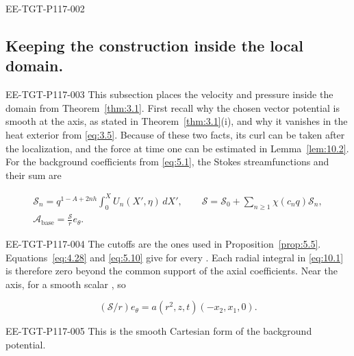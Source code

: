 \begin{EESegment}{EE-TGT-P117-002}
\subsection{Keeping the construction inside the local domain.}\label{sec:10.1}
\end{EESegment}
\begin{EESegment}{EE-TGT-P117-003}
This subsection places the velocity and pressure inside the domain from
Theorem~\ref{thm:3.1}. First recall why the chosen vector potential
 is smooth at the axis, as stated in
Theorem~\ref{thm:3.1}\textup{(i)}, and why it vanishes in the heat exterior from
\eqref{eq:3.5}. Because of these two facts, its curl can be taken after the localization, and the
force at time one can be estimated in Lemma~\ref{lem:10.2}. For the background coefficients
 from \eqref{eq:5.1}, the Stokes streamfunctions and their sum are
\end{EESegment}
\begin{equation}
\begin{gathered}
\mathcal S_n=q^{1-A+2nh}\int_0^XU_n(X',\eta)\,dX',
\qquad \mathcal S=\mathcal S_0+\sum_{n\geq1}\chi(c_nq)\mathcal S_n,\\
\mathcal A_{\mathrm{base}}=\frac{\mathcal S}r e_\theta.
\end{gathered}
\tag{10.1}\label{eq:10.1}
\end{equation}
\begin{EESegment}{EE-TGT-P117-004}
The cutoffs  are the ones used in
Proposition~\ref{prop:5.5}. Equations~\eqref{eq:4.28} and \eqref{eq:5.10} give
 for every
. Each radial integral in \eqref{eq:10.1} is therefore zero beyond
the common support of the axial coefficients. Near the axis,
 for a smooth scalar
, so
\end{EESegment}
\[
(\mathcal S/r)e_\theta=a(r^2,z,t)(-x_2,x_1,0).
\]
\begin{EESegment}{EE-TGT-P117-005}
This is the smooth Cartesian form of the background potential.
\end{EESegment}

